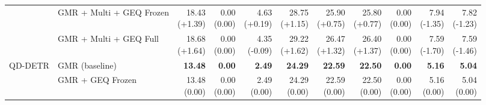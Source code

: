 \documentclass{article}
\begin{document}
{\begin{tabular}{llrrrrrrrrr}
 & GMR + Multi + GEQ Frozen & \shortstack{18.43 \\ {\scriptsize\textcolor{Gain}{(+1.39)}}} & \shortstack{0.00 \\ {\scriptsize\textcolor{Zero}{(0.00)}}} & \shortstack{4.63 \\ {\scriptsize\textcolor{Gain}{(+0.19)}}} & \shortstack{28.75 \\ {\scriptsize\textcolor{Gain}{(+1.15)}}} & \shortstack{25.90 \\ {\scriptsize\textcolor{Gain}{(+0.75)}}} & \shortstack{25.80 \\ {\scriptsize\textcolor{Gain}{(+0.77)}}} & \shortstack{0.00 \\ {\scriptsize\textcolor{Zero}{(0.00)}}} & \shortstack{7.94 \\ {\scriptsize\textcolor{Loss}{(-1.35)}}} & \shortstack{7.82 \\ {\scriptsize\textcolor{Loss}{(-1.23)}}} \\
 & GMR + Multi + GEQ Full & \shortstack{18.68 \\ {\scriptsize\textcolor{Gain}{(+1.64)}}} & \shortstack{0.00 \\ {\scriptsize\textcolor{Zero}{(0.00)}}} & \shortstack{4.35 \\ {\scriptsize\textcolor{Loss}{(-0.09)}}} & \shortstack{29.22 \\ {\scriptsize\textcolor{Gain}{(+1.62)}}} & \shortstack{26.47 \\ {\scriptsize\textcolor{Gain}{(+1.32)}}} & \shortstack{26.40 \\ {\scriptsize\textcolor{Gain}{(+1.37)}}} & \shortstack{0.00 \\ {\scriptsize\textcolor{Zero}{(0.00)}}} & \shortstack{7.59 \\ {\scriptsize\textcolor{Loss}{(-1.70)}}} & \shortstack{7.59 \\ {\scriptsize\textcolor{Loss}{(-1.46)}}} \\
\midrule
QD-DETR & GMR (baseline) & \textbf{13.48} & \textbf{0.00} & \textbf{2.49} & \textbf{24.29} & \textbf{22.59} & \textbf{22.50} & \textbf{0.00} & \textbf{5.16} & \textbf{5.04} \\
 & GMR + GEQ Frozen & \shortstack{13.48 \\ {\scriptsize\textcolor{Zero}{(0.00)}}} & \shortstack{0.00 \\ {\scriptsize\textcolor{Zero}{(0.00)}}} & \shortstack{2.49 \\ {\scriptsize\textcolor{Zero}{(0.00)}}} & \shortstack{24.29 \\ {\scriptsize\textcolor{Zero}{(0.00)}}} & \shortstack{22.59 \\ {\scriptsize\textcolor{Zero}{(0.00)}}} & \shortstack{22.50 \\ {\scriptsize\textcolor{Zero}{(0.00)}}} & \shortstack{0.00 \\ {\scriptsize\textcolor{Zero}{(0.00)}}} & \shortstack{5.16 \\ {\scriptsize\textcolor{Zero}{(0.00)}}} & \shortstack{5.04 \\ {\scriptsize\textcolor{Zero}{(0.00)}}} \\

\end{tabular}}
\end{document}
